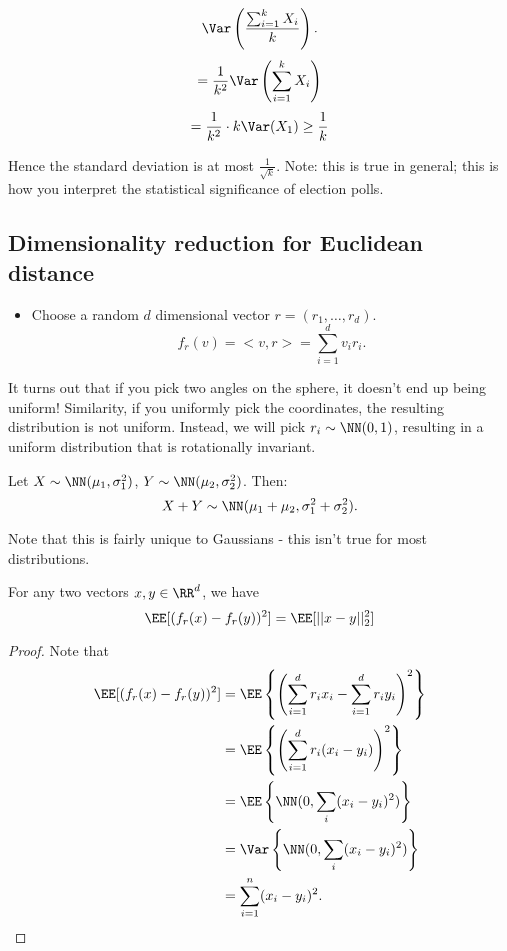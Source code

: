 \[
  \Var \left( \frac{\sum_{i=1}^{k} X_i}{k} \right).
\]
\[
  = \frac{1}{k^2} \Var \left( \sum_{i=1}^{k} X_i \right)
\]
\[
  = \frac{1}{k^2} \cdot k \Var(X_1) \geq \frac{1}{k}
\]

Hence the standard deviation is at most $\frac{1}{\sqrt{k}}$.  Note: this is true in general; this is how you interpret the statistical significance of election polls.

\subsection{Dimensionality reduction for Euclidean distance}

\begin{itemize}
  \item Choose a random $d$ dimensional vector $r = (r_1, \dots, r_d)$.
    \[
      f_r(v) = <v, r> = \sum_{i=1}^{d} v_i r_i.
    \]
\end{itemize}

It turns out that if you pick two angles on the sphere, it doesn't end up being uniform!  Similarity, if you uniformly pick the coordinates, the resulting distribution is not uniform.  Instead, we will pick $r_i \sim \NN(0, 1)$, resulting in a uniform distribution that is rotationally invariant. \\

\begin{fact}
  Let $X \sim \NN(\mu_1, \sigma_1^2)$, $Y \sim \NN(\mu_2, \sigma_2^2)$.  Then:
  \[
    X+Y \sim \NN(\mu_1 + \mu_2, \sigma_1^2 + \sigma_2^2).
  \]
\end{fact}

Note that this is fairly unique to Gaussians - this isn't true for most distributions.

\begin{claim}
  For any two vectors $x, y \in \RR^d$, we have
  \[
    \EE [ (f_r(x) - f_r(y))^2 ] = \EE [ ||x - y||_2^2 ]
  \]
\end{claim}

\begin{proof}
  Note that 
  \begin{align*}
    \EE [ (f_r(x) -  f_r(y))^2 ] &= \EE \left\{ \left( \sum_{i=1}^{d} r_i x_i - \sum_{i=1}^{d} r_i y_i \right)^2 \right\} \\
    &= \EE \left\{ \left( \sum_{i=1}^{d} r_i (x_i - y_i) \right)^2 \right\} \\
    &= \EE \left\{ \NN (0, \sum_i (x_i-y_i)^2) \right\} \\
    &= \Var \left\{ \NN (0, \sum_{i} (x_i - y_i)^2) \right\} \\
    &= \sum_{i=1}^{n} (x_i - y_i)^2.
  \end{align*}
\end{proof}

